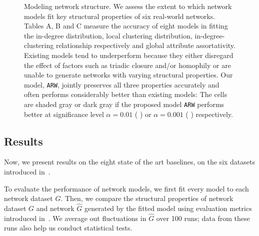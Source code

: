 \begin{figure*}[t]
	\centering
	\vspace{-15mm}
	\vspace{-5mm}
	\caption{
		Modeling network structure. We assess the extent to which network models
		fit key structural properties of six real-world networks. Tables A, B and C
		measure the accuracy of eight models in fitting the in-degree distribution,
		local clustering distribution, in-degree-clustering relationship
		respectively and global attribute assortativity.
		Existing models tend to underperform because they either disregard
		the effect of factors such as triadic closure and/or homophily
		or are unable to generate networks with varying structural properties.
		Our model, \texttt{ARW}, jointly preserves all three properties accurately and often
		performs considerably better than existing models:
		The cells are shaded gray or dark gray if the proposed model \texttt{ARW} performs
		better at significance level $\alpha=0.01$ ( \lightgraybg{ }) or $\alpha=0.001$ ( \darkgraybg{ })
		respectively.
	}
	\label{fig:exp_table}
\end{figure*}

\subsection{Results}
\label{sub:Experimental Results}

Now, we present results on the eight state of the art baselines, on the six datasets introduced in~.

To evaluate the performance of network models, we first fit every model
to each network dataset $G$. Then, we compare the structural properties of
network dataset $G$ and network $\hat{G}$ generated by the fitted model using
evaluation metrics introduced in~. We average out
fluctuations in $\hat{G}$ over 100 runs; data from these runs also help us conduct statistical tests.

